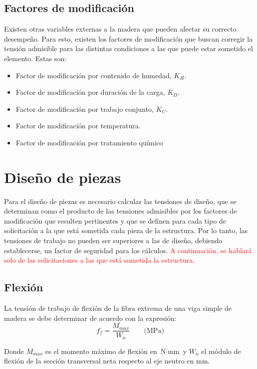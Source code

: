 \subsection{Factores de modificación}
Existen otras variables externas a la madera que pueden afectar su correcto desempeño. Para esto, existen los factores de modificación que buscan corregir la tensión admisible para las distintas condiciones a las que puede estar sometido el elemento. Estas son:
\begin{itemize}
	\item Factor de modificación por contenido de humedad, $K_H$.
	\item Factor de modificación por duración de la carga, $K_D$.
	\item Factor de modificación por trabajo conjunto, $K_C$.
	\item Factor de modificación por temperatura.
	\item Factor de modificación por tratamiento químico
\end{itemize}

\section{Diseño de piezas}
Para el diseño de piezas es necesario calcular las tensiones de diseño, que se determinan como el producto de las tensiones admisibles por los factores de modificación que resulten pertinentes y que se definen para cada tipo de solicitación a la que está sometida cada pieza de la estructura. Por lo tanto, las tensiones de trabajo no pueden ser superiores a las de diseño, debiendo establecerse, un factor de seguridad para los cálculos. \textcolor{red}{A continuación, se hablará solo de las solicitaciones a las que está sometida la estructura.}

\subsection{Flexión}
La tensión de trabajo de flexión de la fibra extrema de una viga simple de madera se debe determinar de acuerdo con la expresión:
\begin{equation} \label{eq:f_f}
	f_f=\frac{M_{max}}{W_n} \qquad \text{(MPa)}
\end{equation}

Donde $M_{max}$ es el momento máximo de flexión en $\text{N}\cdot\text{mm}$ y $W_n$ el módulo de flexión de la sección transversal neta respecto al eje neutro en mm.

